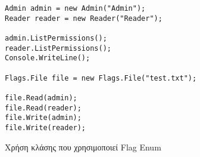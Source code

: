 \begin{listing}[H]
\begin{verbatim}
Admin admin = new Admin("Admin");
Reader reader = new Reader("Reader");

admin.ListPermissions();
reader.ListPermissions();
Console.WriteLine();

Flags.File file = new Flags.File("test.txt");

file.Read(admin);
file.Read(reader);
file.Write(admin);
file.Write(reader);
\end{verbatim}
\caption{Χρήση κλάσης που χρησιμοποιεί Flag Enum}
\label{flagExec}
\end{listing}